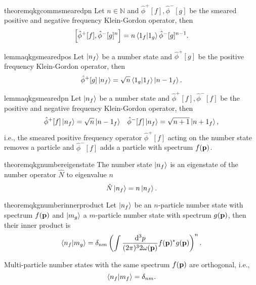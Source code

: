 \begin{restatable}{theorem}{qkgcommsmearedpn}\label{thm:qkg_comm_smeared_pn}
	Let $n\in\mathbb{N}$ and $\hat\phi^+[f],\hat\phi^-[g]$ be the smeared positive and negative frequency Klein-Gordon operator, then
	\begin{equation}
		\comm{\hat\phi^+[f]}{\hat\phi^-[g]^n}
		=
		n
		\braket{1_f}{1_g}
		\hat\phi^-[g]^{n-1}
		.
	\end{equation}
\end{restatable}
\begin{restatable}{lemma}{qkgsmearedpos}\label{thm:qkg_smeared_pos}
	Let $\ket{n_f}$ be a number state and $\hat\phi^+[g]$ be the positive frequency Klein-Gordon operator, then
	\begin{equation}
		\hat\phi^+[g]
		\ket{n_f}
		=
		\sqrt{n}
		\braket{1_g}{1_f}
		\ket{n-1_f}
		.
	\end{equation}
\end{restatable}
\begin{restatable}{lemma}{qkgsmearedpn}\label{thm:qkg_smeared_pn}
	Let $\ket{n_f}$ be a number state and $\hat\phi^+[f],\hat\phi^-[f]$ be the positive and negative frequency Klein-Gordon operator, then
	\begin{align}
		\hat\phi^+[f]
		\ket{n_f}
		=
		\sqrt{n}
		\ket{n-1_f}
		&&
		\hat\phi^-[f]
		\ket{n_f}
		=
		\sqrt{n+1}
		\ket{n+1_f}
		,
	\end{align}
	i.e., the smeared positive frequency operator $\hat\phi^+[f]$ acting on the number state removes a particle and $\hat\phi^-[f]$ adds a particle with spectrum $f(\vb{p})$.
\end{restatable}
\begin{restatable}{theorem}{qkgnumbereigenstate}\label{thm:qkg_number_state_eigenstate}
	The number state $\ket{n_f}$ is an eigenstate of the number operator $\hat{N}$ to eigenvalue $n$
	\begin{equation}
		\hat{N}
		\ket{n_f}
		=
		n
		\ket{n_f}
		.
	\end{equation}
\end{restatable}
\begin{restatable}{theorem}{qkgnumberinnerproduct}\label{thm:qkg_number_state_inner_product}
	Let $\ket{n_f}$ be an $n$-particle number state with spectrum $f(\vb{p})$ and $\ket{m_g}$ a $m$-particle number state with spectrum $g(\vb{p})$, then their inner product is
	\begin{equation}
		\braket{n_f}{m_g}
		=
		\delta_{nm}
		\left(
			\int\frac{\dd[3]{p}}{(2\pi)^32\omega(\vb{p})}
			f(\vb{p})^*
			g(\vb{p})
		\right)^n
		.
	\end{equation}
\end{restatable}
\begin{corollary}
	Multi-particle number states with the same spectrum $f(\vb{p})$ are orthogonal, i.e.,
	\begin{equation}
		\braket{n_f}{m_f}
		=
		\delta_{nm}
		.
	\end{equation}
\end{corollary}

